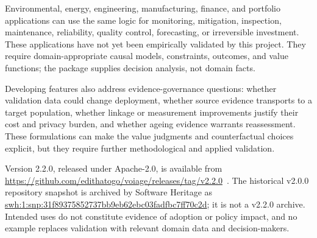 Environmental, energy, engineering, manufacturing, finance, and portfolio
applications can use the same logic for monitoring, mitigation, inspection,
maintenance, reliability, quality control, forecasting, or irreversible
investment. These applications have not yet been empirically validated by this
project. They require domain-appropriate causal models, constraints, outcomes,
and value functions; the package supplies decision analysis, not domain facts.

Developing features also address evidence-governance questions: whether
validation data could change deployment, whether source evidence transports to
a target population, whether linkage or measurement improvements justify
their cost and privacy burden, and whether ageing evidence warrants
reassessment. These formulations can make the value judgments and
counterfactual choices explicit, but they require further methodological and
applied validation.

Version 2.2.0, released under Apache-2.0, is available from
\url{https://github.com/edithatogo/voiage/releases/tag/v2.2.0}~\cite{voiage2026}.
The historical v2.0.0 repository snapshot is archived by Software Heritage as
\url{swh:1:snp:31f89375852737bb9eb62ebc03fadfbc7ff70c2d}; it is not a
v2.2.0 archive. Intended uses do not
constitute evidence of adoption or policy impact, and no example replaces
validation with relevant domain data and decision-makers.
